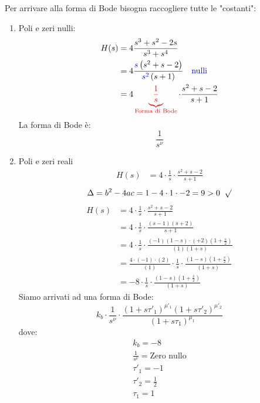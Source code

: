 \documentclass[a4paper]{article}
\begin{document}
\vspace{1em}
\noindent
Per arrivare alla forma di Bode bisogna raccogliere tutte le "costanti":
\begin{enumerate}
  \item Poli e zeri nulli:
    \[
      \begin{aligned}
        H(s) &= 4 \frac{
          s^3 + s^2 - 2s
        }{
          s^3 + s^4
        }\\
        &= 4 \frac{
          \color{blue}s\color{black} \left( s^2 + s - 2 \right) 
        }{
          \color{blue}s^2\color{black} \left( s + 1 \right) 
        } \quad \color{blue} \text{nulli}\\
        &= 4 \color{red}\underbrace{\frac{1}{s}}_{\text{Forma di Bode}}\color{black} \cdot \frac{
          s^2 + s - 2
        }{
          s+1
        }
      \end{aligned}
    \] 
    La \color{red} forma di Bode \color{black} è:
    \[
      \frac{1}{s^{\nu}}
    \]
  \item Poli e zeri reali
    \[
    \begin{aligned}
      H(s) &= 4 \cdot \frac{1}{s} \cdot \frac{
        s^2+s-2
      }{s+1}
    \end{aligned}
    \] 
    \[
    \Delta = b^2 - 4ac = 1 - 4 \cdot 1 \cdot -2 = 9 > 0 \;\; \surd
    \] 
    \[
      \begin{aligned}
        H(s) &= 4 \cdot \frac{1}{s} \cdot \frac{
          s^2+s-2
        }{s+1}\\
             &= 4 \cdot \frac{1}{s} \cdot \frac{
               (s-1)(s+2)
             }{
               s+1
             }\\
           &= 4 \cdot \frac{1}{s} \cdot \frac{
             (-1)(1-s) \cdot (+2)(1+\frac{s}{2})
           }{
             (1)(1+s)
           } \\
           &= \frac{
             4 \cdot (-1) \cdot (2)
           }{(1)}
           \cdot \frac{1}{s}
           \cdot \frac{
             (1-s)(1+\frac{s}{2})
           }{
             (1+s)
           }\\
           &= -8 \cdot \frac{1}{s} \cdot \frac{
             (1-s)(1+\frac{s}{2})
           }{(1+s)}
         \end{aligned}
    \] 
    Siamo arrivati ad una forma di Bode:
    \[
      k_b \cdot \frac{1}{s^{\nu}} \cdot \frac{
        \left( 1 + s \tau'_1 \right)^{\mu'_1} \left( 1 + s \tau'_2 \right)^{\mu'_2}
      }{
        \left( 1 + s\tau_1 \right)^{\mu_1}
      }
    \] 
    dove:
    \[
    \begin{aligned}
      k_b = -8\\
      \frac{1}{s^{\nu}} = \text{Zero nullo}\\
      \tau'_1 = -1\\
      \tau'_2 = \frac{1}{2}\\
      \tau_1 = 1
    \end{aligned}
    \] 


\end{enumerate}
\end{document}
